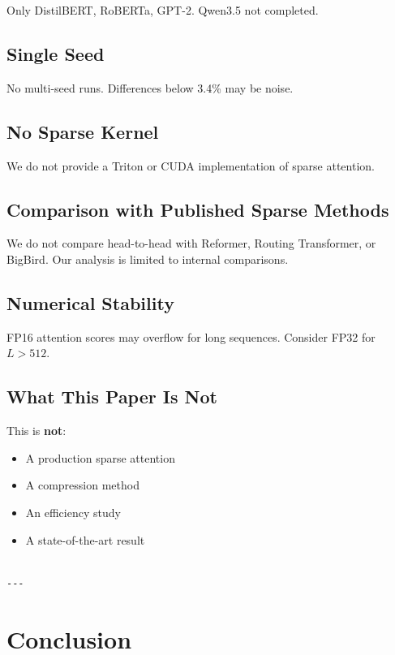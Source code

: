 Only DistilBERT, RoBERTa, GPT-2. Qwen3.5 not completed.

\subsection{Single Seed}

No multi-seed runs. Differences below 3.4\% may be noise.

\subsection{No Sparse Kernel}

We do not provide a Triton or CUDA implementation of sparse attention.

\subsection{Comparison with Published Sparse Methods}

We do not compare head-to-head with Reformer, Routing Transformer, or 
BigBird. Our analysis is limited to internal comparisons.

\subsection{Numerical Stability}

FP16 attention scores may overflow for long sequences. Consider FP32 for 
$L > 512$.

\subsection{What This Paper Is Not}

This is \textbf{not}:
\begin{itemize}
\item A production sparse attention
\item A compression method
\item An efficiency study
\item A state-of-the-art result
\end{itemize}
\begin{lstlisting}

---
\end{lstlisting}


\section{Conclusion}

